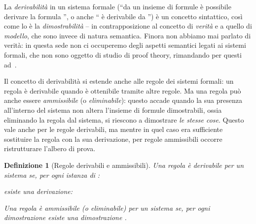 \documentclass[12pt,a4paper,openright,twoside]{report}
\newtheorem{dfn}[thm]{Definizione}
\begin{document}
La \emph{derivabilit\`a} in un sistema formale (``da un insieme di formule  \`e possibile derivare la formula '', o anche `` \`e derivabile da '') \`e un concetto sintattico, cos\`i come lo \`e la \emph{dimostrabilit\`a} -- in contrapposizione al concetto di \emph{verit\`a} e a quello di \emph{modello}, che sono invece di natura semantica. Finora non abbiamo mai parlato di verit\`a: in questa sede non ci occuperemo degli aspetti semantici legati ai sistemi formali, che non sono oggetto di studio di proof theory, rimandando per questi ad~\cite{Abr92, Bar77, Cha73}.

Il concetto di derivabilit\`a si estende anche alle regole dei sistemi formali: un regola \`e derivabile quando \`e ottenibile tramite altre regole. Ma una regola pu\`o anche essere \emph{ammissibile} (o \emph{eliminabile}): questo accade quando la sua presenza all'interno del sistema non altera l'insieme di formule dimostrabili, ossia eliminando la regola dal sistema, si riescono a dimostrare \emph{le stesse cose}. Questo vale anche per le regole derivabili, ma mentre in quel caso era sufficiente sostituire la regola con la sua derivazione, per regole ammissibili occorre ristrutturare l'albero di prova.

\begin{dfn}[Regole derivabili e ammissibili]
Una regola  \`e \emph{derivabile} per un sistema  se, per ogni istanza di :

esiste una derivazione:


Una regola  \`e \emph{ammissibile} (o \emph{eliminabile}) per un sistema  se, per ogni dimostrazione  esiste una dimostrazione .
\end{dfn}
\end{document}
